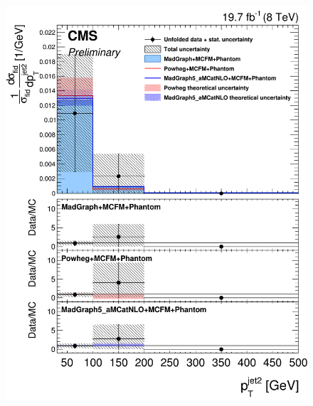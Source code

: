 \begin{figure}[hbtp]
\begin{center}
    \includegraphics[width=\cmsFigWidth]{Figures/DiffCrossSecZZTo4ePtJet2_Unfolded_fr_MadGraph_norm.png}     

\end{center}
\end{figure}
